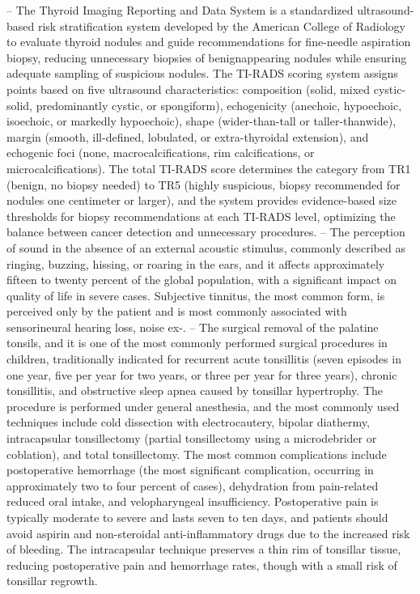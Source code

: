 -- The Thyroid Imaging Reporting and Data System is a standardized ultrasound-based risk stratification system developed by the American College of Radiology to evaluate thyroid nodules and guide recommendations for fine-needle aspiration biopsy, reducing unnecessary biopsies of benignappearing nodules while ensuring adequate sampling of suspicious nodules. The TI-RADS scoring system assigns points based on five ultrasound characteristics: composition (solid, mixed cystic-solid, predominantly cystic, or spongiform), echogenicity (anechoic, hypoechoic, isoechoic, or markedly hypoechoic), shape (wider-than-tall or taller-thanwide), margin (smooth, ill-defined, lobulated, or extra-thyroidal extension), and echogenic foci (none, macrocalcifications, rim calcifications, or microcalcifications). The total TI-RADS score determines the category from TR1 (benign, no biopsy needed) to TR5 (highly suspicious, biopsy recommended for nodules one centimeter or larger), and the system provides evidence-based size thresholds for biopsy recommendations at each TI-RADS level, optimizing the balance between cancer detection and unnecessary procedures.
-- The perception of sound in the absence of an external acoustic stimulus, commonly described as ringing, buzzing, hissing, or roaring in the ears, and it affects approximately fifteen to twenty percent of the global population, with a significant impact on quality of life in severe cases. Subjective tinnitus, the most common form, is perceived only by the patient and is most commonly associated with sensorineural hearing loss, noise ex-.
-- The surgical removal of the palatine tonsils, and it is one of the most commonly performed surgical procedures in children, traditionally indicated for recurrent acute tonsillitis (seven episodes in one year, five per year for two years, or three per year for three years), chronic tonsillitis, and obstructive sleep apnea caused by tonsillar hypertrophy. The procedure is performed under general anesthesia, and the most commonly used techniques include cold dissection with electrocautery, bipolar diathermy, intracapsular tonsillectomy (partial tonsillectomy using a microdebrider or coblation), and total tonsillectomy. The most common complications include postoperative hemorrhage (the most significant complication, occurring in approximately two to four percent of cases), dehydration from pain-related reduced oral intake, and velopharyngeal insufficiency. Postoperative pain is typically moderate to severe and lasts seven to ten days, and patients should avoid aspirin and non-steroidal anti-inflammatory drugs due to the increased risk of bleeding. The intracapsular technique preserves a thin rim of tonsillar tissue, reducing postoperative pain and hemorrhage rates, though with a small risk of tonsillar regrowth.

